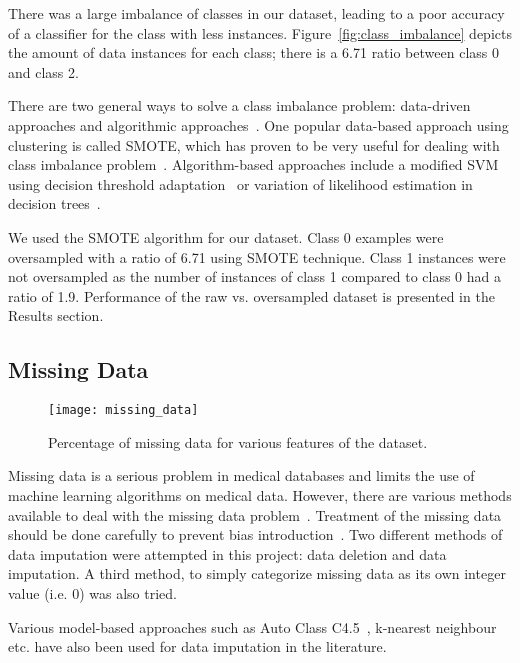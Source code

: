 \documentclass[conference]{IEEEtran}
\begin{document}
There was a large imbalance of classes in our dataset, leading to a poor accuracy of a classifier for the class with less instances. Figure~\ref{fig:class_imbalance} depicts the amount of data instances for each class; there is a 6.71 ratio between class 0 and class 2.

There are two general ways to solve a class imbalance problem: data-driven approaches and algorithmic approaches~\cite{purwar-2014}. One popular data-based approach using clustering is called SMOTE, which has proven to be very useful for dealing with class imbalance problem~\cite{smote-2012}. Algorithm-based approaches include a modified SVM using decision threshold adaptation~\cite{wu-2003, raskutti-2004} or variation of likelihood estimation in decision trees~\cite{weiss-2003}.

We used the SMOTE algorithm for our dataset. Class 0 examples were oversampled with a ratio of 6.71 using SMOTE technique. Class 1 instances were not oversampled as the number of instances of class 1 compared to class 0 had a ratio of 1.9. Performance of the raw vs. oversampled dataset is presented in the Results section.

\subsection{Missing Data}

\begin{figure}[htpb]
	\centering
	\texttt{[image: missing\_data]}
	\caption{Percentage of missing data for various features of the dataset.}
	\label{fig:missing_data}
\end{figure}


Missing data is a serious problem in medical databases and limits the use of machine learning algorithms on medical data. However, there are various methods available to deal with the missing data problem~\cite{imputation-96}. Treatment of the missing data should be done carefully to prevent bias introduction~\cite{gustavo-2003}. Two different methods of data imputation were attempted in this project: data deletion and data imputation. A third method, to simply categorize missing data as its own integer value (i.e. 0) was also tried.

Various model-based approaches such as Auto Class C4.5~\cite{lakshminarayan-1999}, k-nearest neighbour~\cite{gustavo-2003} etc. have also been used for data imputation in the literature. 
\end{document}
